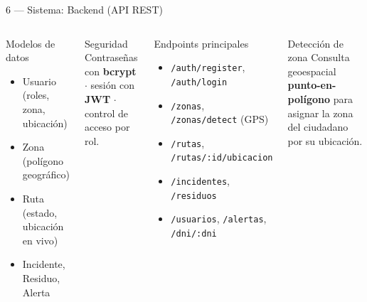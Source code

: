 \documentclass[aspectratio=169, 11pt]{beamer}
\begin{document}
\begin{frame}{6 — Sistema: Backend (API REST)}
    \vspace{-0.3cm}
    \begin{columns}[T]
    \begin{block}{Modelos de datos}
        \footnotesize
        \begin{itemize}
            \item Usuario (roles, zona, ubicación)
            \item Zona (polígono geográfico)
            \item Ruta (estado, ubicación en vivo)
            \item Incidente, Residuo, Alerta
        \end{itemize}
    \end{block}
    \begin{block}{Seguridad}
        \footnotesize
        Contraseñas con \textbf{bcrypt} $\cdot$ sesión con \textbf{JWT} $\cdot$ control de acceso por rol.
    \end{block}

    \begin{block}{Endpoints principales}
        \scriptsize
        \begin{itemize}
            \item \texttt{/auth/register}, \texttt{/auth/login}
            \item \texttt{/zonas}, \texttt{/zonas/detect} (GPS)
            \item \texttt{/rutas}, \texttt{/rutas/:id/ubicacion}
            \item \texttt{/incidentes}, \texttt{/residuos}
            \item \texttt{/usuarios}, \texttt{/alertas}, \texttt{/dni/:dni}
        \end{itemize}
    \end{block}
    \begin{block}{Detección de zona}
        \scriptsize
        Consulta geoespacial \textbf{punto-en-polígono} para asignar la zona del ciudadano por su ubicación.
    \end{block}
    \end{columns}
\end{frame}
\end{document}

